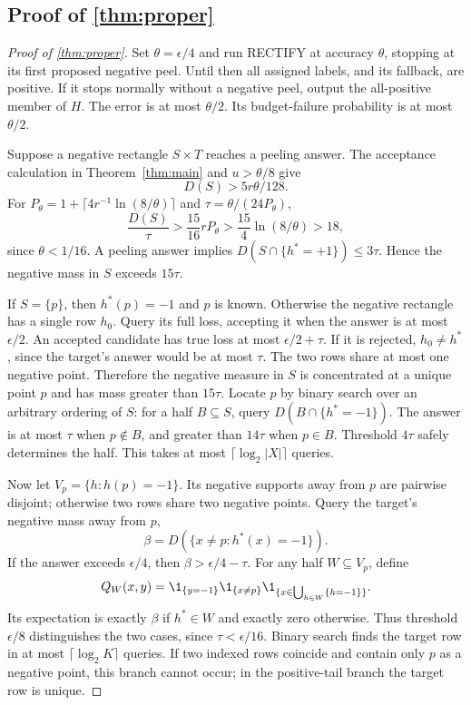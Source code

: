 \subsection[Proof of result proper]{Proof of \cref{thm:proper}}\label{proof:proper}
\begin{proof}[Proof of \cref{thm:proper}]
Set $\theta=\epsilon/4$ and run RECTIFY at accuracy $\theta$, stopping at its first proposed negative peel. Until then all assigned labels, and its fallback, are positive. If it stops normally without a negative peel, output the all-positive member of $H$. The error is at most $\theta/2$. Its budget-failure probability is at most $\theta/2$.

Suppose a negative rectangle $S\times T$ reaches a peeling answer. The acceptance calculation in Theorem~\ref{thm:main} and $u>\theta/8$ give
\[
 D(S)>5r\theta/128.
\]
For $P_\theta=1+\lceil4r^{-1}\ln(8/\theta)\rceil$ and $\tau=\theta/(24P_\theta)$,
\[
 \frac{D(S)}\tau>\frac{15}{16}rP_\theta
 >\frac{15}{4}\ln(8/\theta)>18,
\]
since $\theta<1/16$. A peeling answer implies $D(S\cap\{h^*=+1\})\le3\tau$. Hence the negative mass in $S$ exceeds $15\tau$.

If $S=\{p\}$, then $h^*(p)=-1$ and $p$ is known. Otherwise the negative rectangle has a single row $h_0$. Query its full loss, accepting it when the answer is at most $\epsilon/2$. An accepted candidate has true loss at most $\epsilon/2+\tau$. If it is rejected, $h_0\ne h^*$, since the target's answer would be at most $\tau$. The two rows share at most one negative point. Therefore the negative measure in $S$ is concentrated at a unique point $p$ and has mass greater than $15\tau$. Locate $p$ by binary search over an arbitrary ordering of $S$: for a half $B\subseteq S$, query $D(B\cap\{h^*=-1\})$. The answer is at most $\tau$ when $p\notin B$, and greater than $14\tau$ when $p\in B$. Threshold $4\tau$ safely determines the half. This takes at most $\lceil\log_2|X|\rceil$ queries.

Now let $V_p=\{h:h(p)=-1\}$. Its negative supports away from $p$ are pairwise disjoint; otherwise two rows share two negative points. Query the target's negative mass away from $p$,
\[
 \beta=D(\{x\ne p:h^*(x)=-1\}).
\]
If the answer exceeds $\epsilon/4$, then $\beta>\epsilon/4-\tau$. For any half $W\subseteq V_p$, define
\[
 Q_W(x,y)=\1_{\{y=-1\}}\1_{\{x\ne p\}}
 \1_{\{x\in\bigcup_{h\in W}\{h=-1\}\}}.
\]
Its expectation is exactly $\beta$ if $h^*\in W$ and exactly zero otherwise. Thus threshold $\epsilon/8$ distinguishes the two cases, since $\tau<\epsilon/16$. Binary search finds the target row in at most $\lceil\log_2K\rceil$ queries. If two indexed rows coincide and contain only $p$ as a negative point, this branch cannot occur; in the positive-tail branch the target row is unique.


\end{proof}
